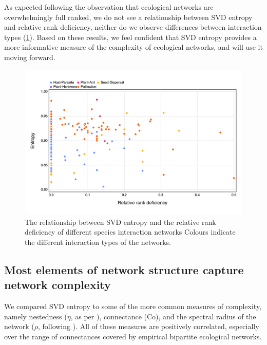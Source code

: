 As expected following the observation that ecological networks are
overwhelmingly full ranked, we do not see a relationship between SVD entropy and
relative rank deficiency, neither do we observe differences between interaction
types (\ref{fig:entropy_v_rank}). Based on these results, we feel confident that
SVD entropy provides a more informative measure of the complexity of ecological
networks, and will use it moving forward.

\begin{figure}[h]
    \centering
    \includegraphics[width=\textwidth]{figures/entropy_v_rank.png}
    \caption{The relationship between SVD entropy and the relative rank
deficiency of different species interaction networks Colours indicate the
different interaction types of the networks.}
    \label{fig:entropy_v_rank}
\end{figure}

\subsection{Most elements of network structure capture network
complexity}\label{most-elements-of-network-structure-capture-network-complexity}

We compared SVD entropy to some of the more common measures of complexity,
namely nestedness (\(\eta\), as per \cite{Bastolla2009ArcMut}),
connectance (\(\text{Co}\)), and the spectral radius of the network (\(\rho\),
following \cite{Staniczenko2013GhoNes}). All of these measures are
positively correlated, especially over the range of connectances covered by
empirical bipartite ecological networks.

